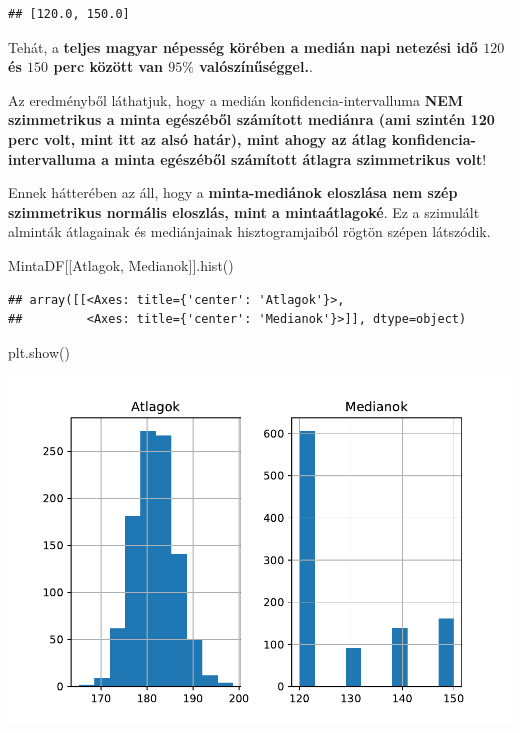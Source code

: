 \documentclass[
]{book}
\newenvironment{Shaded}{\begin{snugshade}}{\end{snugshade}}
\newcommand{\NormalTok}[1]{#1}
\newcommand{\StringTok}[1]{\textcolor[rgb]{0.31,0.60,0.02}{#1}}
\begin{document}
\begin{verbatim}
## [120.0, 150.0]
\end{verbatim}

Tehát, a \textbf{teljes magyar népesség körében a medián napi netezési idő \(120\) és \(150\) perc között van \(95\%\) valószínűséggel.}.

Az eredményből láthatjuk, hogy a medián konfidencia-intervalluma \textbf{NEM szimmetrikus a minta egészéből számított mediánra (ami szintén 120 perc volt, mint itt az alsó határ), mint ahogy az átlag konfidencia-intervalluma a minta egészéből számított átlagra szimmetrikus volt}!

Ennek hátterében az áll, hogy a \textbf{minta-mediánok eloszlása nem szép szimmetrikus normális eloszlás, mint a mintaátlagoké}. Ez a szimulált alminták átlagainak és mediánjainak hisztogramjaiból rögtön szépen látszódik.

\begin{Shaded}
\begin{Highlighting}[]
\NormalTok{MintaDF[[}\StringTok{\textquotesingle{}Atlagok\textquotesingle{}}\NormalTok{, }\StringTok{\textquotesingle{}Medianok\textquotesingle{}}\NormalTok{]].hist()}
\end{Highlighting}
\end{Shaded}

\begin{verbatim}
## array([[<Axes: title={'center': 'Atlagok'}>,
##         <Axes: title={'center': 'Medianok'}>]], dtype=object)
\end{verbatim}

\begin{Shaded}
\begin{Highlighting}[]
\NormalTok{plt.show()}
\end{Highlighting}
\end{Shaded}

\includegraphics{_main_files/figure-latex/unnamed-chunk-308-17.pdf}
\end{document}
